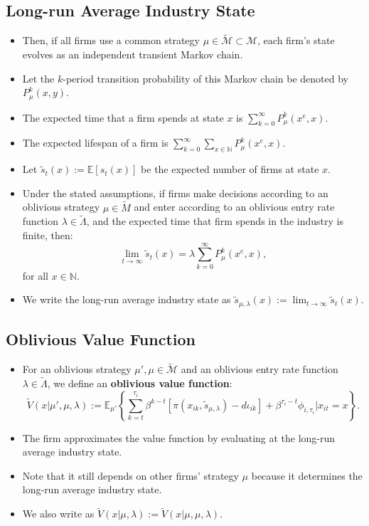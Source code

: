 \documentclass[]{book}
\providecommand{\tightlist}{%
  \setlength{\itemsep}{0pt}\setlength{\parskip}{0pt}}
\begin{document}
\subsection{Long-run Average Industry
State}\label{long-run-average-industry-state}

\begin{itemize}
\tightlist
\item
  Then, if all firms use a common strategy
  \(\mu \in \widetilde{\mathcal{M}} \subset \mathcal{M}\), each firm's
  state evolves as an independent transient Markov chain.
\item
  Let the \(k\)-period transition probability of this Markov chain be
  denoted by \(P_{\mu}^k(x, y)\).
\item
  The expected time that a firm spends at state \(x\) is
  \(\sum_{k = 0}^\infty P_\mu^k(x^e, x)\).
\item
  The expected lifespan of a firm is
  \(\sum_{k = 0}^\infty \sum_{x \in \mathbb{N}} P_\mu^k(x^e, x)\).
\item
  Let \(\tilde{s}_t(x) := \mathbb{E}[s_t(x)]\) be the expected number of
  firms at state \(x\).
\item
  Under the stated assumptions, if firms make decisions according to an
  oblivious strategy \(\mu \in \widetilde{M}\) and enter according to an
  oblivious entry rate function \(\lambda \in \widetilde{\Lambda}\), and
  the expected time that firm spends in the industry is finite, then: \[
   \lim_{t \to \infty} \tilde{s}_t(x) = \lambda \sum_{k = 0}^\infty P_{\mu}^k(x^e, x),
   \] for all \(x \in \mathbb{N}\).
\item
  We write the long-run average industry state as
  \(\tilde{s}_{\mu, \lambda}(x) := \lim_{t \to \infty} \tilde{s}_t(x)\).
\end{itemize}

\subsection{Oblivious Value Function}\label{oblivious-value-function}

\begin{itemize}
\item
  For an oblivious strategy \(\mu', \mu \in \widetilde{\mathcal{M}}\)
  and an oblivious entry rate function
  \(\lambda \in \widetilde{\Lambda}\), we define an \textbf{oblivious
  value function}: \[
  \widetilde{V}(x|\mu', \mu, \lambda) := \mathbb{E}_{\mu'} \left\{\sum_{k = t}^{\tau_i} \beta^{k - t}[\pi(x_{ik}, \tilde{s}_{\mu, \lambda}) - d \iota_{ik}] + \beta^{\tau_i - t} \phi_{i, \tau_i}| x_{it} = x \right\}.
  \]
\item
  The firm approximates the value function by evaluating at the long-run
  average industry state.
\item
  Note that it still depends on other firms' strategy \(\mu\) because it
  determines the long-run average industry state.
\item
  We also write as
  \(\widetilde{V}(x|\mu, \lambda) := \widetilde{V}(x|\mu, \mu, \lambda)\).
\end{itemize}
\end{document}
